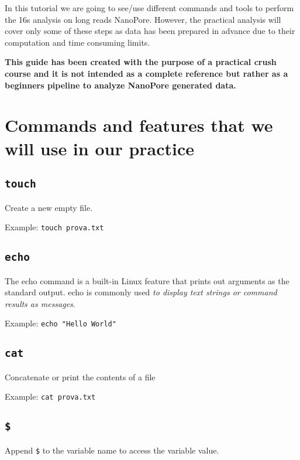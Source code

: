 \documentclass[
]{book}
\begin{document}
In this tutorial we are going to see/use different commands and tools to perform the 16s analysis on long reads NanoPore. However, the practical analysis will cover only some of these steps as data has been prepared in advance due to their computation and time consuming limits.

\textbf{This guide has been created with the purpose of a practical crush course and it is not intended as a complete reference but rather as a beginners pipeline to analyze NanoPore generated data.}

\section{Commands and features that we will use in our practice}\label{commands-and-features-that-we-will-use-in-our-practice}

\subsection{\texorpdfstring{\texttt{touch}}{touch}}\label{touch}

Create a new empty file.

Example: \texttt{touch\ prova.txt}

\subsection{\texorpdfstring{\texttt{echo}}{echo}}\label{echo}

The echo command is a built-in Linux feature that prints out arguments as the standard output. echo is commonly used \emph{to display text strings or command results as messages}.

Example: \texttt{echo\ "Hello\ World"}

\subsection{\texorpdfstring{\texttt{cat}}{cat}}\label{cat}

Concatenate or print the contents of a file

Example: \texttt{cat\ prova.txt}

\subsection{\texorpdfstring{\texttt{\$}}{\$}}\label{section}

Append \texttt{\$} to the variable name to access the variable value.
\end{document}
